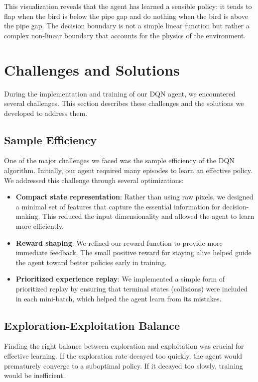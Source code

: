 \documentclass[conference]{IEEEtran}
\begin{document}
This visualization reveals that the agent has learned a sensible policy: it tends to flap when the bird is below the pipe gap and do nothing when the bird is above the pipe gap. The decision boundary is not a simple linear function but rather a complex non-linear boundary that accounts for the physics of the environment.

\section{Challenges and Solutions}
\label{sec:challenges}

During the implementation and training of our DQN agent, we encountered several challenges. This section describes these challenges and the solutions we developed to address them.

\subsection{Sample Efficiency}
One of the major challenges we faced was the sample efficiency of the DQN algorithm. Initially, our agent required many episodes to learn an effective policy. We addressed this challenge through several optimizations:

\begin{itemize}
    \item \textbf{Compact state representation}: Rather than using raw pixels, we designed a minimal set of features that capture the essential information for decision-making. This reduced the input dimensionality and allowed the agent to learn more efficiently.
    
    \item \textbf{Reward shaping}: We refined our reward function to provide more immediate feedback. The small positive reward for staying alive helped guide the agent toward better policies early in training.
    
    \item \textbf{Prioritized experience replay}: We implemented a simple form of prioritized replay by ensuring that terminal states (collisions) were included in each mini-batch, which helped the agent learn from its mistakes.
\end{itemize}

\subsection{Exploration-Exploitation Balance}
Finding the right balance between exploration and exploitation was crucial for effective learning. If the exploration rate decayed too quickly, the agent would prematurely converge to a suboptimal policy. If it decayed too slowly, training would be inefficient.
\end{document}
